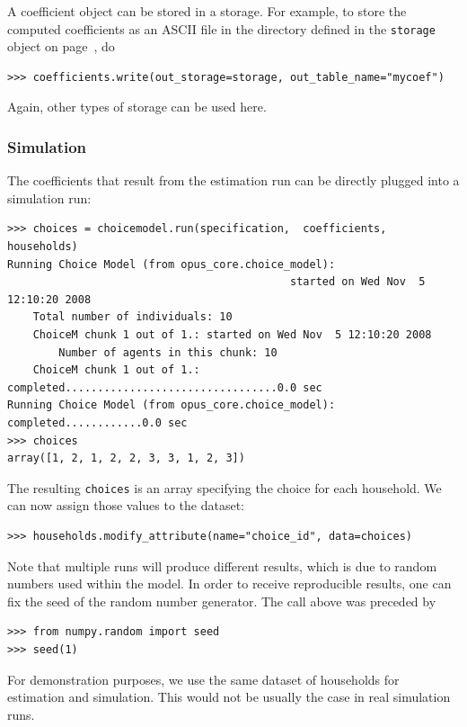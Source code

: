 A coefficient \coefficientsindex object can
be stored in a storage. For example, to store the computed coefficients \coefficientsindex as an
ASCII file  in the directory defined in the \verb|storage| object
on page~\pageref{storagepage}, do
\coefficientsindex
\begin{verbatim}
>>> coefficients.write(out_storage=storage, out_table_name="mycoef")
\end{verbatim}
Again, other types of storage can be used here.


\subsubsection{Simulation}
%
The coefficients \coefficientsindex that result from the estimation run can be directly plugged
into a simulation run:
\coefficientsindex
\begin{verbatim}
>>> choices = choicemodel.run(specification,  coefficients, households)
Running Choice Model (from opus_core.choice_model): 
                                            started on Wed Nov  5 12:10:20 2008
    Total number of individuals: 10
    ChoiceM chunk 1 out of 1.: started on Wed Nov  5 12:10:20 2008
        Number of agents in this chunk: 10
    ChoiceM chunk 1 out of 1.: completed.................................0.0 sec
Running Choice Model (from opus_core.choice_model): completed............0.0 sec
>>> choices
array([1, 2, 1, 2, 2, 3, 3, 1, 2, 3])
\end{verbatim}
The resulting \verb|choices| is an array specifying the choice for each household. We can
now assign those values to the dataset: \datasetindex
\begin{verbatim}
>>> households.modify_attribute(name="choice_id", data=choices)
\end{verbatim}

Note that multiple runs will produce different results, which is due to random
numbers  used within the model. In order to receive reproducible results, one
can fix the seed of the random number generator. The call above was
preceded by
\numpyindex
\begin{verbatim}
>>> from numpy.random import seed
>>> seed(1)
\end{verbatim}

For demonstration purposes, we use the same dataset of households
for estimation and simulation. This would not be usually the case in real
simulation runs.

